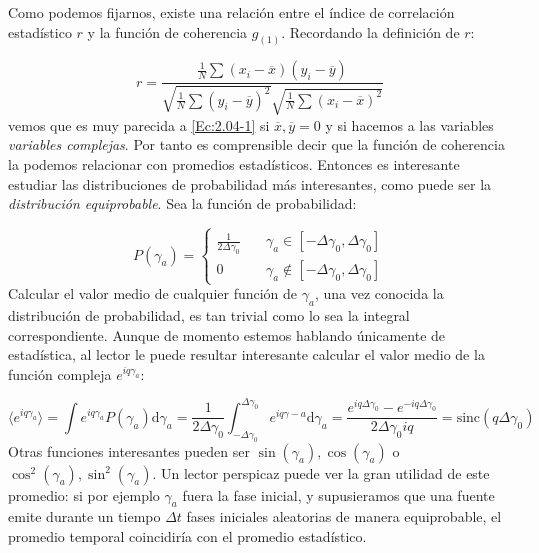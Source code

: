 \documentclass[12pt,a4paper]{book}
\numberwithin{equation}{section}
\numberwithin{figure}{section}
\newcommand{\D}{\mathrm{d}}
\newcommand{\1}{_{(1)}}
\newcommand{\2}{_{(2)}}
\theoremstyle{definition}
\begin{document}
Como podemos fijarnos, existe una relación entre el índice de correlación estadístico $r$ y la función de coherencia $g\1$. Recordando la definición de $r$:

\begin{equation}
r=\frac{\frac{1}{N}\sum (x_i - \overline{x})(y_i-\overline{y})}{\sqrt{ \frac{1}{N}\sum (y_i-\overline{y})^2} \sqrt{ \frac{1}{N}  \sum (x_i - \overline{x})^2}}
\end{equation}
vemos que es muy parecida a \ref{Ec:2.04-1} si $\overline{x},\overline{y}=0$ y si hacemos a las variables \textit{variables complejas}. Por tanto es comprensible decir que la función de coherencia la podemos relacionar con promedios estadísticos. Entonces es interesante estudiar las distribuciones de probabilidad más interesantes, como puede ser la \textit{distribución equiprobable}. Sea la función de probabilidad:

\begin{equation}
P (\gamma_a) = \left\lbrace
\begin{array}{cl}
\frac{1}{2 \Delta \gamma_0} & \quad \gamma_a \in [-\Delta \gamma_0,\Delta \gamma_0] \\
0 & \quad \gamma_a \notin [-\Delta \gamma_0,\Delta \gamma_0]
\end{array}
\right.
\end{equation}
Calcular el valor medio de cualquier función de $\gamma_a$, una vez conocida la distribución de probabilidad, es tan trivial como lo sea la integral correspondiente. Aunque de momento estemos hablando únicamente de estadística, al lector le puede resultar interesante calcular el valor medio de la función compleja $e^{i q \gamma_a}$:

\begin{equation}
\langle e^{i q \gamma_a} \rangle = \int e^{i q \gamma_a}  P(\gamma_a) \D \gamma_a = \frac{1}{2 \Delta \gamma_0} \int_{-\Delta \gamma_0}^{\Delta \gamma_0} e^{i q \gamma-a} \D \gamma_a = \dfrac{e^{i q \Delta \gamma_0} -e^{-i q \Delta \gamma_0} }{2 \Delta \gamma_0 i q } = \mathrm{sinc} (q \Delta \gamma_0)
\end{equation}
Otras funciones interesantes pueden ser $\sin (\gamma_a), \cos (\gamma_a)$ o $\cos^2 ( \gamma_a),\sin^2(\gamma_a)$. Un lector perspicaz puede ver la gran utilidad de este promedio: si por ejemplo $\gamma_a$ fuera la fase inicial, y supusieramos que una fuente emite durante un tiempo $\Delta t$ fases iniciales aleatorias de manera equiprobable, el promedio temporal coincidiría con el promedio estadístico.  
\end{document}
